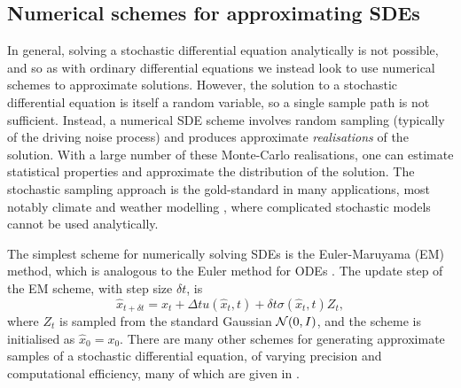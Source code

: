 \subsection{Numerical schemes for approximating SDEs}
In general, solving a stochastic differential equation analytically is not possible, and so as with ordinary differential equations we instead look to use numerical schemes to approximate solutions.
However, the solution to a stochastic differential equation is itself a random variable, so a single sample path is not sufficient.
Instead, a numerical SDE scheme involves random sampling (typically of the driving noise process) and produces approximate \emph{realisations} of the solution.
With a large number of these Monte-Carlo realisations, one can estimate statistical properties and approximate the distribution of the solution.
The stochastic sampling approach is the gold-standard in many applications, most notably climate and weather modelling \citep{Collins_2007_EnsemblesProbabilitiesNew},  where complicated stochastic models cannot be used analytically.

The simplest scheme for numerically solving SDEs is the Euler-Maruyama (EM) method, which is analogous to the Euler method for ODEs \citep{KloedenPlaten_1992_NumericalSolutionStochastic}.
The update step of the EM scheme, with step size \(\delta t\), is
\begin{equation}
	\hat{x}_{t + \delta t} = \hat{x}_{t} + \Delta t u\!\left(\hat{x}_t, t\right) + \delta t \sigma\!\left(\hat{x}_t, t\right) Z_t,
	\label{eqn:em_step}
\end{equation}
where \(Z_t\) is sampled from the standard Gaussian \(\mathcal{N}\!\left(0,I\right)\), and the scheme is initialised as \(\hat{x}_0 = x_0\).
There are many other schemes for generating approximate samples of a stochastic differential equation, of varying precision and computational efficiency, many of which are given in \citet{KloedenPlaten_1992_NumericalSolutionStochastic}.







